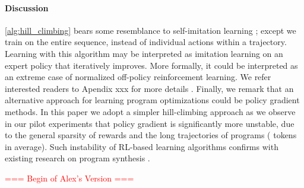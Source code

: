 \documentclass{article}
\begin{document}
\paragraph{Discussion} \cref{alg:hill_climbing} bears some resemblance to self-imitation learning \cite{oh2018self} ; except we train on the entire sequence, instead of individual actions within a trajectory. Learning with this algorithm may be interpreted as imitation learning on an expert policy that iteratively improves. 
More formally, it could be interpreted as an extreme case of normalized off-policy reinforcement learning. We refer interested readers to Apendix xxx for more details . 
Finally, we remark that an alternative approach for learning program optimizations could be policy gradient methods.
In this paper we adopt a simpler hill-climbing approach as we observe in our pilot experiments that policy gradient is significantly more unstable, due to the general sparsity of rewards and the long trajectories of programs ( tokens in average).
Such instability of RL-based learning algorithms confirms with existing research on program synthesis \citep{bunel2018leveraging}.







\textcolor{red}{=== Begin of Alex's Version ===}

\end{document}
